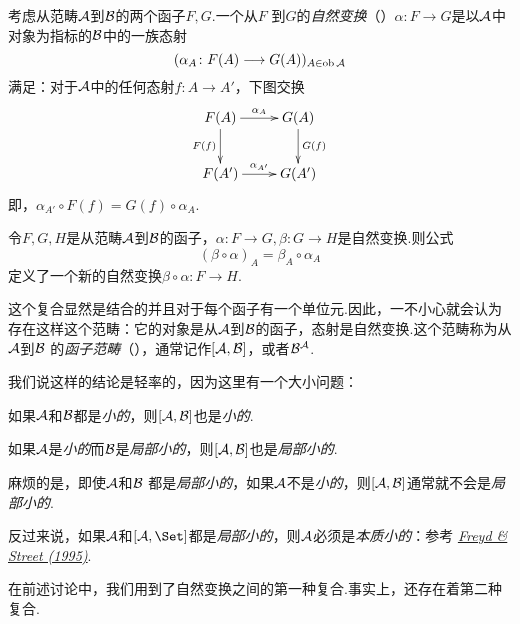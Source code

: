   \begin{defn}
    考虑从范畴${\cal A}$到${\cal B}$的两个函子$ F, G$.一个从$ F$ 到$ G$的\emph{自然变换}（）$\alpha\colon F\to G$是以${\cal A}$中对象为指标的${\cal B}$中的一族态射
    \begin{equation*}
    (\alpha_A\colon F(A)\longrightarrow G(A))_{A\in\operatorname{ob}{\cal A}}
    \end{equation*}
    满足：对于${\cal A}$中的任何态射$f\colon A \to A'$，下图交换
    \begin{displaymath}
      \xymatrix{
          F(A)\ar[r]^{\alpha_A}\ar[d]_{F(f)}& G(A)\ar[d]^{G(f)}\\
          F(A')\ar[r]^{\alpha_{A'}}& G(A')
      }
    \end{displaymath}
    即，$\alpha_{A'}\circ F(f) =  G(f) \circ \alpha_{A}$.
  \end{defn}

  令$ F, G, H$是从范畴${\cal A}$到${\cal B}$的函子，$\alpha\colon F\to G, \beta\colon G\to H$是自然变换.则公式
  \begin{equation*}
    (\beta\circ\alpha)_A = \beta_A\circ\alpha_A
  \end{equation*}
  定义了一个新的自然变换$\beta\circ\alpha\colon F\to H$.

  这个复合显然是结合的并且对于每个函子有一个单位元.因此，一不小心就会认为存在这样这个范畴：它的对象是从${\cal A}$到${\cal B}$的函子，态射是自然变换.这个范畴称为从${\cal A}$到${\cal B}$ 的\emph{函子范畴}（），通常记作$[{\cal A},{\cal B}]$，或者${\cal B}^{{\cal A}}$. 
  \begin{rem}
    我们说这样的结论是轻率的，因为这里有一个大小问题：

    如果${\cal A}$和${\cal B}$都是\emph{小的}，则$[{\cal A},{\cal B}]$也是\emph{小的}.

    如果${\cal A}$是\emph{小的}而${\cal B}$是\emph{局部小的}，则$[{\cal A},{\cal B}]$也是\emph{局部小的}.

    麻烦的是，即使${\cal A}$和${\cal B}$ 都是\emph{局部小的}，如果${\cal A}$不是\emph{小的}，则$[{\cal A},{\cal B}]$通常就不会是\emph{局部小的}.

    反过来说，如果${\cal A}$和$[\Aa,\Set]$都是\emph{局部小的}，则${\cal A}$必须是\emph{本质小的}：参考
    \href{http://tac.mta.ca/tac/volumes/1995/n9/1-09abs.html}{\emph{Freyd \& Street (1995)}}.
  \end{rem}

  在前述讨论中，我们用到了自然变换之间的第一种复合.事实上，还存在着第二种复合.


